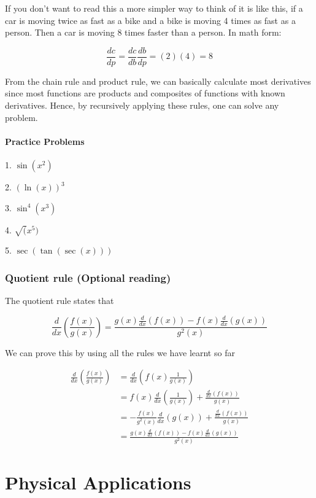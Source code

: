\documentclass[a4paper,12pt,oneside]{book}
\begin{document}
\noindent If you don't want to read this a more simpler way to think of it is like this, if a car is moving twice as fast as a bike and a bike is moving 4 times as fast as a person. Then a car is moving 8 times faster than a person. In math form:

$$\frac{dc}{dp}=\frac{dc}{db}\frac{db}{dp}=(2)(4)=8$$

\noindent From the chain rule and product rule, we can basically calculate most derivatives since most functions are products and composites of functions with known derivatives. Hence, by recursively applying these rules, one can solve any problem.

\subsection{Practice Problems}

1. $\sin(x^2)$

2. $(\ln(x))^3$

3. $\sin^4(x^3)$

4. $\sqrt(x^5)$

5. $\sec(\tan(\sec(x)))$

\section{Quotient rule (Optional reading)}

The quotient rule states that

$$\frac{d}{dx}\left(\frac{f(x)}{g(x)}\right) = \frac{g(x)\frac{d}{dx}(f(x))-f(x)\frac{d}{dx}(g(x))}{g^2(x)}$$

\noindent We can prove this by using all the rules we have learnt so far

$$\begin{aligned}
\frac{d}{dx}\left(\frac{f(x)}{g(x)}\right)&=\frac{d}{dx}\left(f(x)\frac{1}{g(x)}\right)\\
&=f(x)\frac{d}{dx}\left(\frac{1}{g(x)}\right)+\frac{\frac{d}{dx}(f(x))}{g(x)}\\
&=-\frac{f(x)}{g^2(x)}\frac{d}{dx}(g(x))+\frac{\frac{d}{dx}(f(x))}{g(x)}\\
&=\frac{g(x)\frac{d}{dx}(f(x))-f(x)\frac{d}{dx}(g(x))}{g^2(x)}
\end{aligned}$$

\part{Physical Applications}

\newpage
\end{document}
